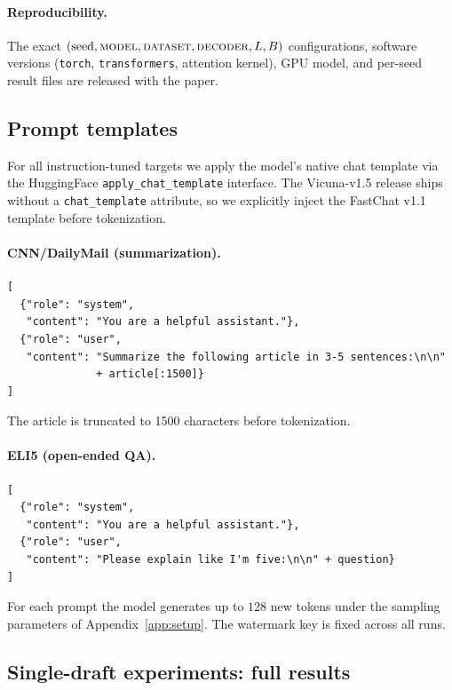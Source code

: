 \paragraph{Reproducibility.}
The exact $(\mathrm{seed},\textsc{model},\textsc{dataset},\textsc{decoder},L,B)$
configurations, software versions
(\texttt{torch}, \texttt{transformers}, attention kernel), GPU model, and
per-seed result files are released with the paper.

\subsection{Prompt templates}
\label{app:prompts}

For all instruction-tuned targets we apply the model's native chat template
via the HuggingFace \texttt{apply\_chat\_template} interface. The
Vicuna-v1.5 release ships without a \texttt{chat\_template} attribute, so we
explicitly inject the FastChat v1.1 template before tokenization.

\paragraph{CNN/DailyMail (summarization).}
\begin{verbatim}
[
  {"role": "system",
   "content": "You are a helpful assistant."},
  {"role": "user",
   "content": "Summarize the following article in 3-5 sentences:\n\n"
              + article[:1500]}
]
\end{verbatim}
The article is truncated to 1500 characters before tokenization.

\paragraph{ELI5 (open-ended QA).}
\begin{verbatim}
[
  {"role": "system",
   "content": "You are a helpful assistant."},
  {"role": "user",
   "content": "Please explain like I'm five:\n\n" + question}
]
\end{verbatim}

For each prompt the model generates up to $128$ new tokens under the sampling
parameters of Appendix~\ref{app:setup}. The watermark key is fixed across all
runs.

\subsection{Single-draft experiments: full results}
\label{app:single_draft_full}


